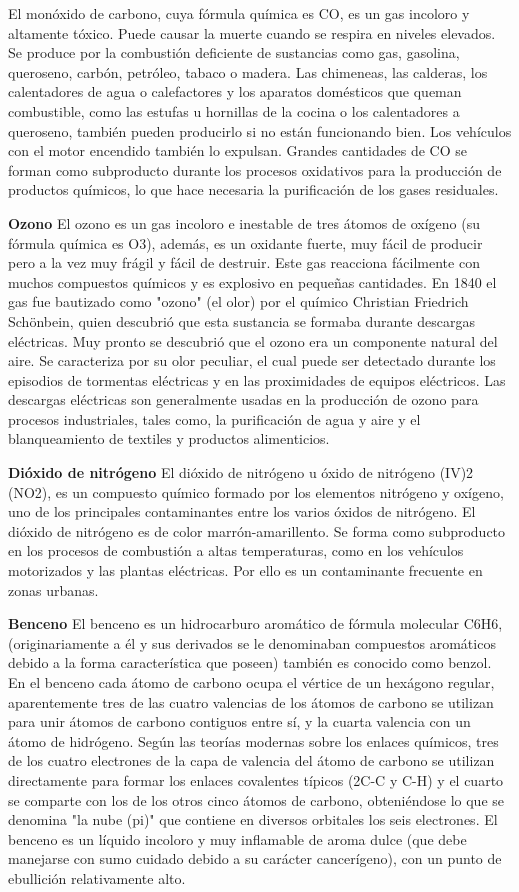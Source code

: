 El monóxido de carbono, cuya fórmula química es CO, es un gas incoloro y altamente tóxico. Puede causar la muerte cuando se respira en niveles elevados. Se produce por la combustión deficiente de sustancias como gas, gasolina, queroseno, carbón, petróleo, tabaco o madera. Las chimeneas, las calderas, los calentadores de agua o calefactores y los aparatos domésticos que queman combustible, como las estufas u hornillas de la cocina o los calentadores a queroseno, también pueden producirlo si no están funcionando bien. Los vehículos con el motor encendido también lo expulsan. Grandes cantidades de CO se forman como subproducto durante los procesos oxidativos para la producción de productos químicos, lo que hace necesaria la purificación de los gases residuales. 

\textbf{Ozono}
El ozono es un gas incoloro e inestable de tres átomos de oxígeno (su fórmula química es O3), además, es un oxidante fuerte, muy fácil de producir pero a la vez muy frágil y fácil de destruir. Este gas reacciona fácilmente con muchos compuestos químicos y es explosivo en pequeñas cantidades. En 1840 el gas fue bautizado como "ozono" (el olor) por el químico Christian Friedrich Schönbein, quien descubrió que esta sustancia se formaba durante descargas eléctricas. Muy pronto se descubrió que el ozono era un componente natural del aire. Se caracteriza por su olor peculiar, el cual puede ser detectado durante los episodios de tormentas eléctricas y en las proximidades de equipos eléctricos. Las descargas eléctricas son generalmente usadas en la producción de ozono para procesos industriales, tales como, la purificación de agua y aire y el blanqueamiento de textiles y productos alimenticios.

\textbf{Dióxido de nitrógeno}
El dióxido de nitrógeno u óxido de nitrógeno (IV)2 (NO2), es un compuesto químico formado por los elementos nitrógeno y oxígeno, uno de los principales contaminantes entre los varios óxidos de nitrógeno.
El dióxido de nitrógeno es de color marrón-amarillento. Se forma como subproducto en los procesos de combustión a altas temperaturas, como en los vehículos motorizados y las plantas eléctricas. Por ello es un contaminante frecuente en zonas urbanas.

\textbf{Benceno}
El benceno es un hidrocarburo aromático de fórmula molecular C6H6, (originariamente a él y sus derivados se le denominaban compuestos aromáticos debido a la forma característica que poseen) también es conocido como benzol. En el benceno cada átomo de carbono ocupa el vértice de un hexágono regular, aparentemente tres de las cuatro valencias de los átomos de carbono se utilizan para unir átomos de carbono contiguos entre sí, y la cuarta valencia con un átomo de hidrógeno. Según las teorías modernas sobre los enlaces químicos, tres de los cuatro electrones de la capa de valencia del átomo de carbono se utilizan directamente para formar los enlaces covalentes típicos (2C-C y C-H) y el cuarto se comparte con los de los otros cinco átomos de carbono, obteniéndose lo que se denomina "la nube (pi)" que contiene en diversos orbitales los seis electrones. El benceno es un líquido incoloro y muy inflamable de aroma dulce (que debe manejarse con sumo cuidado debido a su carácter cancerígeno), con un punto de ebullición relativamente alto.

